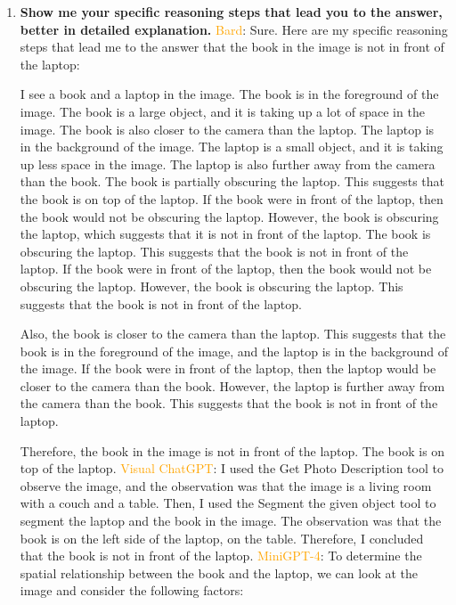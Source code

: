 \begin{enumerate}
    Therefore, the book in the image is not in front of the laptop. The book is on top of the laptop.
    \subitem \textcolor{orange}{Visual ChatGPT}: The book is not in front of the laptop, it is on the left side of the laptop, on the table.
    \subitem \textcolor{orange}{MiniGPT-4}: No, the book is on a coffee table next to the couch, while the laptop is on a desk in the corner of the room.
    \item \textbf{Show me your specific reasoning steps that lead you to the answer, better in detailed explanation.}
    \subitem \textcolor{orange}{Bard}: Sure. Here are my specific reasoning steps that lead me to the answer that the book in the image is not in front of the laptop:

    I see a book and a laptop in the image.
    The book is in the foreground of the image. The book is a large object, and it is taking up a lot of space in the image. The book is also closer to the camera than the laptop.
    The laptop is in the background of the image. The laptop is a small object, and it is taking up less space in the image. The laptop is also further away from the camera than the book.
    The book is partially obscuring the laptop. This suggests that the book is on top of the laptop.
    If the book were in front of the laptop, then the book would not be obscuring the laptop. However, the book is obscuring the laptop, which suggests that it is not in front of the laptop.
    The book is obscuring the laptop. This suggests that the book is not in front of the laptop. If the book were in front of the laptop, then the book would not be obscuring the laptop. However, the book is obscuring the laptop. This suggests that the book is not in front of the laptop.
    
    Also, the book is closer to the camera than the laptop. This suggests that the book is in the foreground of the image, and the laptop is in the background of the image. If the book were in front of the laptop, then the laptop would be closer to the camera than the book. However, the laptop is further away from the camera than the book. This suggests that the book is not in front of the laptop.
    
    Therefore, the book in the image is not in front of the laptop. The book is on top of the laptop.
    \subitem \textcolor{orange}{Visual ChatGPT}: I used the Get Photo Description tool to observe the image, and the observation was that the image is a living room with a couch and a table. Then, I used the Segment the given object tool to segment the laptop and the book in the image. The observation was that the book is on the left side of the laptop, on the table. Therefore, I concluded that the book is not in front of the laptop.
    \subitem \textcolor{orange}{MiniGPT-4}: To determine the spatial relationship between the book and the laptop, we can look at the image and consider the following factors:


\end{enumerate}
